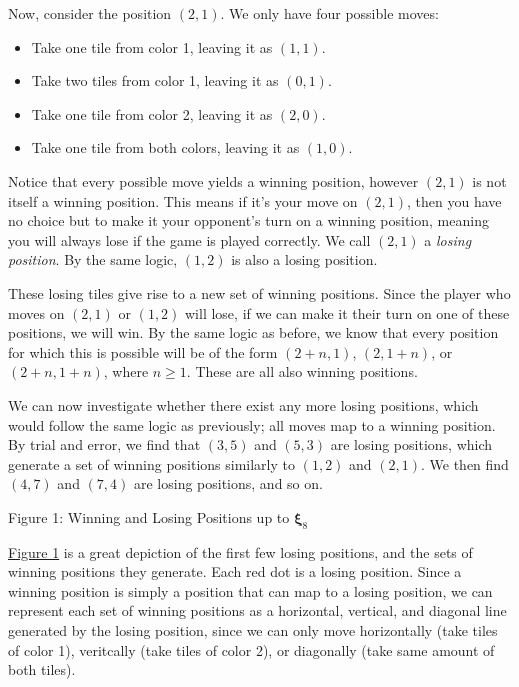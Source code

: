 \documentclass[11pt, letterpaper]{article}
\begin{document}
Now, consider the position $(2,1)$. We only have four possible moves:
\begin{itemize}
	\item Take one tile from color 1, leaving it as $(1,1)$.
	\item Take two tiles from color 1, leaving it as $(0,1)$.
	\item Take one tile from color 2, leaving it as $(2,0)$.
	\item Take one tile from both colors, leaving it as $(1,0)$.
\end{itemize}
Notice that every possible move yields a winning position, however $(2,1)$ is not itself a winning position. This means if it's your move on $(2,1)$, then you have no choice but to make it your opponent's turn on a winning position, meaning you will always lose if the game is played correctly. We call $(2,1)$ a \emph{losing position}. By the same logic, $(1,2)$ is also a losing position.

These losing tiles give rise to a new set of winning positions. Since the player who moves on $(2,1)$ or $(1,2)$ will lose, if we can make it their turn on one of these positions, we will win. By the same logic as before, we know that every position for which this is possible will be of the form $(2+n,1)$, $(2,1+n)$, or $(2+n,1+n)$, where $n\geq 1$. These are all also winning positions.

We can now investigate whether there exist any more losing positions, which would follow the same logic as previously; all moves map to a winning position. By trial and error, we find that $(3,5)$ and $(5,3)$ are losing positions, which generate a set of winning positions similarly to $(1,2)$ and $(2,1)$. We then find $(4,7)$ and $(7,4 )$ are losing positions, and so on.

\begin{center}
	Figure 1: Winning and Losing Positions up to $\boldsymbol{\xi}_8$\label{fig:1}
\end{center}

\hyperref[fig:1]{Figure 1} is a great depiction of the first few losing positions, and the sets of winning positions they generate. Each red dot is a losing position. Since a winning position is simply a position that can map to a losing position, we can represent each set of winning positions as a horizontal, vertical, and diagonal line generated by the losing position, since we can only move horizontally (take tiles of color 1), veritcally (take tiles of color 2), or diagonally (take same amount of both tiles).
\end{document}
